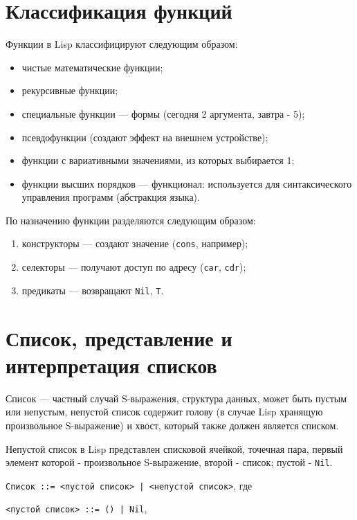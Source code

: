 \section{Классификация функций}

Функции в Lisp классифицируют следующим образом:

\begin{itemize}
    \item чистые математические функции;
    \item рекурсивные функции;
    \item специальные функции --- формы (сегодня 2 аргумента, завтра - 5);
    \item псевдофункции (создают эффект на внешнем устройстве);
    \item функции с вариативными значениями, из которых выбирается 1;
    \item функции высших порядков --- функционал: используется для синтаксического управления программ (абстракция языка).
\end{itemize}

По назначению функции разделяются следующим образом:

\begin{enumerate}
    \item конструкторы --- создают значение (\texttt{cons}, например);
    \item селекторы --- получают доступ по адресу (\texttt{car}, \texttt{cdr});
    \item предикаты --- возвращают \texttt{Nil}, \texttt{T}.
\end{enumerate}

\section{Список, представление и интерпретация списков}

Список --- частный случай S-выражения, структура данных, может быть пустым или непустым, непустой список содержит голову (в случае Lisp хранящую произвольное S-выражение) и хвост, который также должен является списком.

Непустой список в Lisp представлен списковой ячейкой, точечная пара, первый элемент которой - произвольное S-выражение, второй - список; пустой - \texttt{Nil}.

\texttt{Список ::= <пустой список> | <непустой список>}, где 

\texttt{<пустой список> ::= () | Nil},

